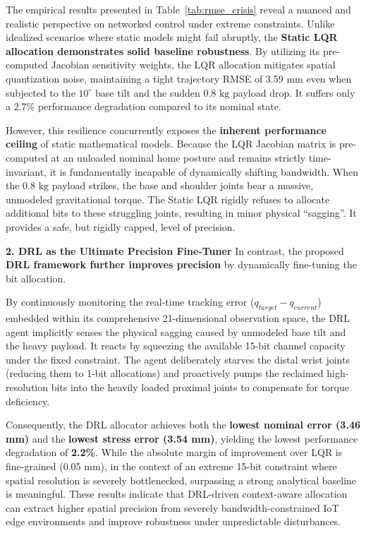 The empirical results presented in Table~\ref{tab:rmse_crisis} reveal a nuanced and realistic perspective on networked control under extreme 
constraints. Unlike idealized scenarios where static models might fail abruptly, the \textbf{Static LQR allocation demonstrates solid baseline robustness}.
By utilizing its pre-computed Jacobian sensitivity weights, the LQR allocation mitigates spatial quantization noise, maintaining a tight trajectory RMSE of 3.59 mm even when subjected to the $10^\circ$ base tilt and the sudden $0.8\text{ kg}$
payload drop. It suffers only a 2.7\% performance degradation compared to its nominal state.

However, this resilience concurrently exposes the \textbf{inherent performance ceiling} of static mathematical models. Because the LQR Jacobian 
matrix is pre-computed at an unloaded nominal home posture and remains strictly time-invariant, it is fundamentally incapable of dynamically 
shifting bandwidth. When the $0.8\text{ kg}$ payload strikes, the base and shoulder joints bear a massive, unmodeled gravitational torque. The Static 
LQR rigidly refuses to allocate additional bits to these struggling joints, resulting in minor physical ``sagging''. It provides a safe, but rigidly capped,
level of precision.

\noindent\textbf{2. DRL as the Ultimate Precision Fine-Tuner}
In contrast, the proposed \textbf{DRL framework further improves precision} by dynamically fine-tuning the bit allocation.

By continuously monitoring the real-time tracking error ($q_{target}-q_{current}$) embedded within its comprehensive 21-dimensional 
observation space, the DRL agent implicitly senses the physical sagging caused by unmodeled base tilt and the heavy payload. It reacts 
by squeezing the available 15-bit channel capacity under the fixed constraint. The agent deliberately starves 
the distal wrist joints (reducing them to 1-bit allocations) and proactively pumps the reclaimed high-resolution bits into the heavily loaded 
proximal joints to compensate for torque deficiency.

Consequently, the DRL allocator achieves both the \textbf{lowest nominal error (3.46 mm)} and the \textbf{lowest stress error (3.54 mm)}, yielding the 
lowest performance degradation of \textbf{2.2\%}. While the absolute margin of improvement over LQR is fine-grained (0.05 mm), in the context 
of an extreme 15-bit constraint where spatial resolution is severely bottlenecked, surpassing a strong analytical baseline is meaningful. These results indicate that DRL-driven context-aware allocation can extract higher spatial precision from severely bandwidth-constrained 
IoT edge environments and improve robustness under unpredictable disturbances.

